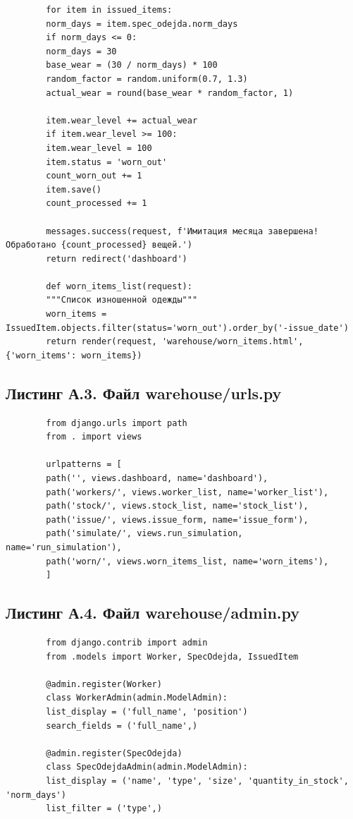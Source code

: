\documentclass[14pt,a4paper]{extreport}
\begin{document}
\begin{singlespacing}
\begin{lstlisting}
		for item in issued_items:
		norm_days = item.spec_odejda.norm_days
		if norm_days <= 0:
		norm_days = 30
		base_wear = (30 / norm_days) * 100
		random_factor = random.uniform(0.7, 1.3)
		actual_wear = round(base_wear * random_factor, 1)
		
		item.wear_level += actual_wear
		if item.wear_level >= 100:
		item.wear_level = 100
		item.status = 'worn_out'
		count_worn_out += 1
		item.save()
		count_processed += 1
		
		messages.success(request, f'Имитация месяца завершена! Обработано {count_processed} вещей.')
		return redirect('dashboard')
		
		def worn_items_list(request):
		"""Список изношенной одежды"""
		worn_items = IssuedItem.objects.filter(status='worn_out').order_by('-issue_date')
		return render(request, 'warehouse/worn_items.html', {'worn_items': worn_items})
	\end{lstlisting}
	
	\subsection*{Листинг А.3. Файл warehouse/urls.py}
	
	\begin{lstlisting}
		from django.urls import path
		from . import views
		
		urlpatterns = [
		path('', views.dashboard, name='dashboard'),
		path('workers/', views.worker_list, name='worker_list'),
		path('stock/', views.stock_list, name='stock_list'),
		path('issue/', views.issue_form, name='issue_form'),
		path('simulate/', views.run_simulation, name='run_simulation'),
		path('worn/', views.worn_items_list, name='worn_items'),
		]
	\end{lstlisting}
	
	\subsection*{Листинг А.4. Файл warehouse/admin.py}
	
	\begin{lstlisting}
		from django.contrib import admin
		from .models import Worker, SpecOdejda, IssuedItem
		
		@admin.register(Worker)
		class WorkerAdmin(admin.ModelAdmin):
		list_display = ('full_name', 'position')
		search_fields = ('full_name',)
		
		@admin.register(SpecOdejda)
		class SpecOdejdaAdmin(admin.ModelAdmin):
		list_display = ('name', 'type', 'size', 'quantity_in_stock', 'norm_days')
		list_filter = ('type',)
		

\end{lstlisting}
\end{singlespacing}
\end{document}
